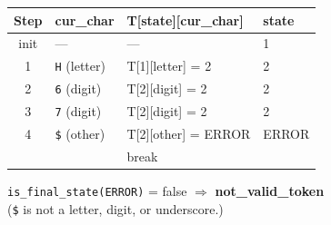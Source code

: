\documentclass[a4paper,12pt]{article}
\begin{document}
\begin{center}
\renewcommand{\arraystretch}{1.2}
\begin{tabular}{c|l|l|l}
\toprule
\textbf{Step} & \textbf{cur\_char} & \textbf{T[state][cur\_char]} & \textbf{state} \\
\midrule
init  & ---                     & ---                        & 1 \\
1     & \texttt{H} (letter)     & T[1][letter] = 2           & 2 \\
2     & \texttt{6} (digit)      & T[2][digit] = 2            & 2 \\
3     & \texttt{7} (digit)      & T[2][digit] = 2            & 2 \\
4     & \texttt{\$} (other)     & T[2][other] = ERROR        & ERROR \\
      &                         & break                       & \\
\bottomrule
\end{tabular}
\end{center}
\texttt{is\_final\_state(ERROR)} = false $\Rightarrow$ \textbf{not\_valid\_token}\\
(\texttt{\$} is not a letter, digit, or underscore.)
\end{document}
